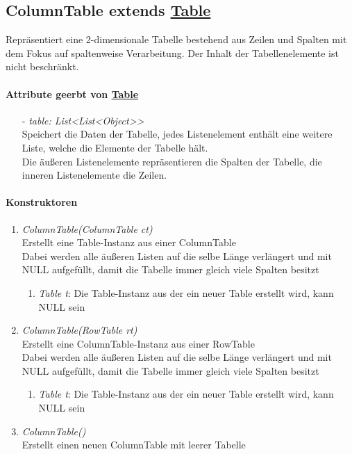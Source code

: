 \subsection{ColumnTable extends \hyperref[Table]{Table}}

Repräsentiert eine 2-dimensionale Tabelle bestehend aus Zeilen und Spalten mit dem Fokus auf spaltenweise Verarbeitung. Der Inhalt der Tabellenelemente ist nicht beschränkt.


\paragraph{Attribute geerbt von \hyperref[Table]{Table}}

\begin{itemize}
	\item[-] \textit{table: List{<List<Object>}>} \\
	Speichert die Daten der Tabelle, jedes Listenelement enthält eine weitere Liste, welche die Elemente der Tabelle hält. \\
	Die äußeren Listenelemente repräsentieren die Spalten der Tabelle, die inneren Listenelemente die Zeilen.
\end{itemize}


\paragraph{Konstruktoren}

\begin{enumerate}[+]
	\item \textit{ColumnTable(ColumnTable ct)} \\
	Erstellt eine Table-Instanz aus einer ColumnTable \\
	Dabei werden alle äußeren Listen auf die selbe Länge verlängert und mit NULL aufgefüllt, damit die Tabelle immer gleich viele Spalten besitzt	
	\begin{enumerate}[$\bullet$]
		\item \textit{Table t}: Die Table-Instanz aus der ein neuer Table erstellt wird, kann NULL sein
	\end{enumerate}
	\vspace{-0.2cm}
	
	\item \textit{ColumnTable(RowTable rt)} \\
	Erstellt eine ColumnTable-Instanz aus einer RowTable \\
	Dabei werden alle äußeren Listen auf die selbe Länge verlängert und mit NULL aufgefüllt, damit die Tabelle immer gleich viele Spalten besitzt	
	\begin{enumerate}[$\bullet$]
		\item \textit{Table t}: Die Table-Instanz aus der ein neuer Table erstellt wird, kann NULL sein
	\end{enumerate}
	\vspace{-0.2cm}
	
	\item \textit{ColumnTable()} \\
	Erstellt einen neuen ColumnTable mit leerer Tabelle
\end{enumerate}

